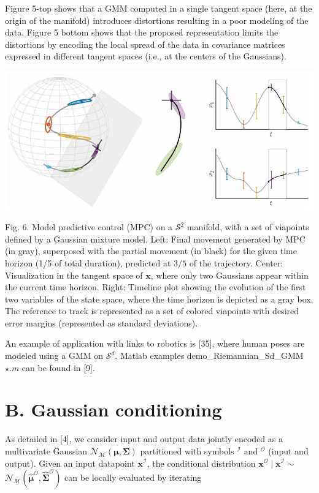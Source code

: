 \documentclass[10pt]{article}
\begin{document}
Figure 5-top shows that a GMM computed in a single tangent space (here, at the origin of the manifold) introduces distortions resulting in a poor modeling of the data. Figure 5 bottom shows that the proposed representation limits the distortions by encoding the local spread of the data in covariance matrices expressed in different tangent spaces (i.e., at the centers of the Gaussians).

\begin{center}
\includegraphics[max width=\textwidth]{2023_01_25_b4240e152b7ba97a594cg-06}
\end{center}

Fig. 6. Model predictive control (MPC) on a $\mathcal{S}^{2}$ manifold, with a set of viapoints defined by a Gaussian mixture model. Left: Final movement generated by MPC (in gray), superposed with the partial movement (in black) for the given time horizon (1/5 of total duration), predicted at $3 / 5$ of the trajectory. Center: Visualization in the tangent space of $\boldsymbol{x}$, where only two Gaussians appear within the current time horizon. Right: Timeline plot showing the evolution of the first two variables of the state space, where the time horizon is depicted as a gray box. The reference to track is represented as a set of colored viapoints with desired error margins (represented as standard deviations).

An example of application with links to robotics is [35], where human poses are modeled using a GMM on $\mathcal{S}^{d}$. Matlab examples demo\_Riemannian\_Sd\_GMM $\star . m$ can be found in [9].

\section{B. Gaussian conditioning}
As detailed in [4], we consider input and output data jointly encoded as a multivariate Gaussian $\mathcal{N}_{\mathcal{M}}(\boldsymbol{\mu}, \boldsymbol{\Sigma})$ partitioned with symbols ${ }^{\mathcal{I}}$ and ${ }^{\mathcal{O}}$ (input and output). Given an input datapoint $\boldsymbol{x}^{\mathcal{I}}$, the conditional distribution $\boldsymbol{x}^{\mathcal{O}} \mid \boldsymbol{x}^{\mathcal{I}} \sim$ $\mathcal{N}_{\mathcal{M}}\left(\hat{\boldsymbol{\mu}}^{\mathcal{O}}, \hat{\boldsymbol{\Sigma}}^{\mathcal{O}}\right)$ can be locally evaluated by iterating
\end{document}
